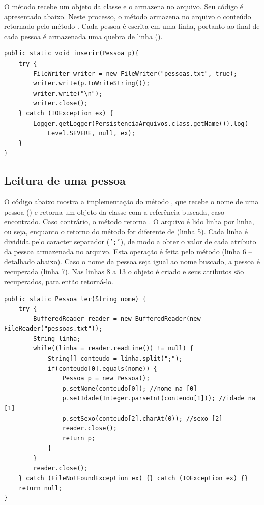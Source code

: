 O método  recebe um objeto da classe  e o armazena no arquivo. Seu código é apresentado abaixo. Neste processo, o método armazena no arquivo o conteúdo retornado pelo método . Cada pessoa é escrita em uma linha, portanto ao final de cada pessoa é armazenada uma quebra de linha ().

\begin{verbatim}
public static void inserir(Pessoa p){
	try {
		FileWriter writer = new FileWriter("pessoas.txt", true);
		writer.write(p.toWriteString());
		writer.write("\n");
		writer.close();
	} catch (IOException ex) {
		Logger.getLogger(PersistenciaArquivos.class.getName()).log(
			Level.SEVERE, null, ex);
	}
}
\end{verbatim}

\subsection{Leitura de uma pessoa}

O código abaixo mostra a implementação do método , que recebe o nome de uma pessoa () e retorna um objeto da classe  com a referência buscada, caso encontrado. Caso contrário, o método retorna . O arquivo é lido linha por linha, ou seja, enquanto o retorno do método  for diferente de  (linha 5). Cada linha é dividida pelo caracter separador (\texttt{';'}), de modo a obter o valor de cada atributo da pessoa armazenada no arquivo. Esta operação é feita pelo método  (linha 6 -- detalhado abaixo). Caso o nome da pessoa seja igual ao nome buscado, a pessoa é recuperada (linha 7). Nas linhas 8 a 13 o objeto  é criado e seus atributos são recuperados, para então retorná-lo.

\begin{verbatim}
public static Pessoa ler(String nome) {
	try {
		BufferedReader reader = new BufferedReader(new FileReader("pessoas.txt"));
		String linha;
		while((linha = reader.readLine()) != null) {
			String[] conteudo = linha.split(";");
			if(conteudo[0].equals(nome)) {
				Pessoa p = new Pessoa();
				p.setNome(conteudo[0]); //nome na [0]
				p.setIdade(Integer.parseInt(conteudo[1])); //idade na [1]
				p.setSexo(conteudo[2].charAt(0)); //sexo [2]
				reader.close();
				return p;
			}
		}
		reader.close();
	} catch (FileNotFoundException ex) {} catch (IOException ex) {}
	return null;
}
\end{verbatim}


